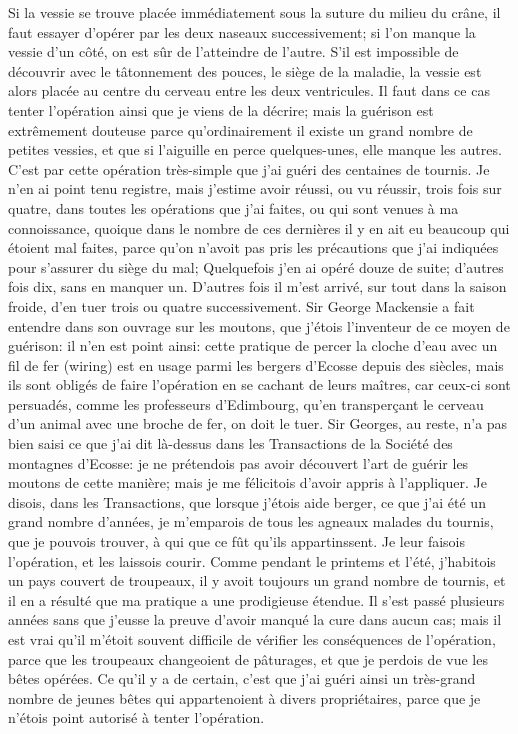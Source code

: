 Si la vessie se trouve placée immédiatement sous la suture du milieu du crâne, il faut essayer d'opérer par les deux naseaux successivement; si l'on manque la vessie d'un côté, on est sûr de l'atteindre de l'autre. S'il est impossible de découvrir avec le tâtonnement des pouces, le siège de la maladie, la vessie est alors placée au centre du cerveau entre les deux ventricules. Il faut dans ce cas tenter l'opération ainsi que je viens de la décrire; mais la guérison est extrêmement douteuse parce qu'ordinairement il existe un grand nombre de petites vessies, et que si l'aiguille en perce quelques-unes, elle manque les autres.
C'est par cette opération très-simple que j'ai guéri des centaines de tournis. Je n'en ai point tenu registre, mais j'estime avoir réussi, ou vu réussir, trois fois sur quatre, dans toutes les opérations que j'ai faites, ou\setcounter{page}{253} qui sont venues à ma connoissance, quoique dans le nombre de ces dernières il y en ait eu beaucoup qui étoient mal faites, parce qu'on n'avoit pas pris les précautions que j'ai indiquées pour s'assurer du siège du mal; Quelquefois j'en ai opéré douze de suite; d'autres fois dix, sans en manquer un. D'autres fois il m'est arrivé, sur tout dans la saison froide, d'en tuer trois ou quatre successivement.
Sir George Mackensie a fait entendre dans son ouvrage sur les moutons, que j'étois l'inventeur de ce moyen de guérison: il n'en est point ainsi: cette pratique de percer la cloche d'eau avec un fil de fer (wiring) est en usage parmi les bergers d'Ecosse depuis des siècles, mais ils sont obligés de faire l'opération en se cachant de leurs maîtres, car ceux-ci sont persuadés, comme les professeurs d'Edimbourg, qu'en transperçant le cerveau d'un animal avec une broche de fer, on doit le tuer. Sir Georges, au reste, n'a pas bien saisi ce que j'ai dit là-dessus dans les Transactions de la Société des montagnes d'Ecosse: je ne prétendois pas avoir découvert l'art de guérir les moutons de cette manière; mais je me félicitois d'avoir appris à l'appliquer. Je disois, dans les Transactions, que lorsque j'étois aide berger, ce que j'ai\setcounter{page}{254} été un grand nombre d'années, je m'emparois de tous les agneaux malades du tournis, que je pouvois trouver, à qui que ce fût qu'ils appartinssent. Je leur faisois l'opération, et les laissois courir. Comme pendant le printems et l'été, j'habitois un pays couvert de troupeaux, il y avoit toujours un grand nombre de tournis, et il en a résulté que ma pratique a une prodigieuse étendue. Il s'est passé plusieurs années sans que j'eusse la preuve d'avoir manqué la cure dans aucun cas; mais il est vrai qu'il m'étoit souvent difficile de vérifier les conséquences de l'opération, parce que les troupeaux changeoient de pâturages, et que je perdois de vue les bêtes opérées. Ce qu'il y a de certain, c'est que j'ai guéri ainsi un très-grand nombre de jeunes bêtes qui appartenoient à divers propriétaires, parce que je n'étois point autorisé à tenter l'opération.
